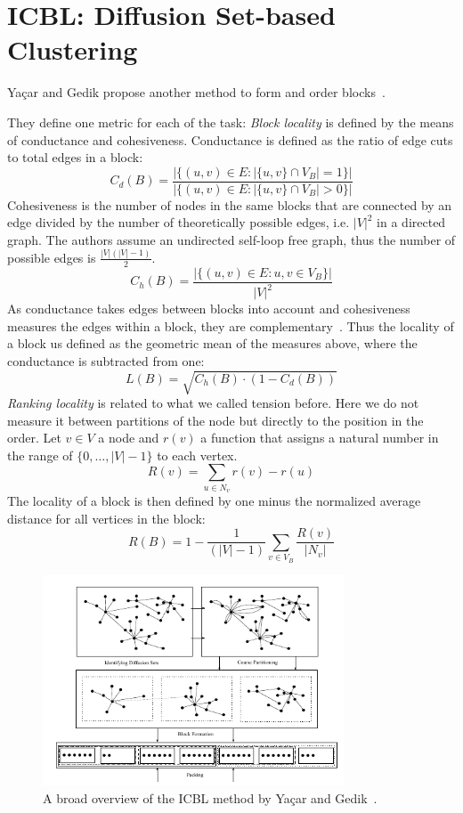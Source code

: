     
\section{ICBL: Diffusion Set-based Clustering}
    Ya\c{c}ar and Gedik propose another method to form and order blocks~\autocite{yacsar2015scalable, yacsar2017distributed}. 
        
    They define one metric for each of the task:
    \textit{Block locality} is defined by the means of conductance and cohesiveness. 
    Conductance is defined as the ratio of edge cuts to total edges in a block:
    \[ C_d (B) = \frac{|\{ (u,v) \in E: |\{u,v\} \cap V_B| = 1\}|}{|\{ (u,v) \in E: |\{u,v\} \cap V_B| > 0\}|} \]
    Cohesiveness is the number of nodes in the same blocks that are connected by an edge divided by the number of theoretically possible edges, i.e. $|V|^2$ in a directed graph. The authors assume an undirected self-loop free graph, thus the number of possible edges is $\frac{|V| (|V| - 1)}{2}$.
    \[ C_h (B) = \frac{|\{ (u,v) \in E: u,v \in V_B \}|}{|V|^2} \]
    As conductance takes edges between blocks into account and cohesiveness measures the edges within a block, they are complementary~\autocite{yacsar2015scalable}.
    Thus the locality of a block us defined as the geometric mean of the measures above, where the conductance is subtracted from one:
    \[ L(B) = \sqrt{C_h (B) \cdot (1 - C_d (B))} \]
    \textit{Ranking locality} is related to what we called tension before. 
    Here we do not measure it between partitions of the node but directly to the position in the order. 
    Let $v \in V$ a node and $r(v)$ a function that assigns a natural number in the range of $\{0, \dots, |V|-1\}$ to each vertex.
    \[ R (v) = \sum_{u \in N_v} r(v) - r(u) \]
    The locality of a block is then defined by one minus the normalized average distance for all vertices in the block:
    \[ R(B) = 1 - \frac{1}{(|V| - 1)} \sum_{v \in V_B} \frac{R(v)}{|N_v|} \]
    
    \begin{figure}[htp]
        \begin{center}
            \includegraphics[keepaspectratio,width=0.8\textwidth]{img/06-rel_w/icbl.png}
        \end{center}
        \caption{A broad overview of the ICBL method by Ya\c{c}ar and Gedik~\autocite{yacsar2015scalable}.} 
        \label{icbl}
    \end{figure}

